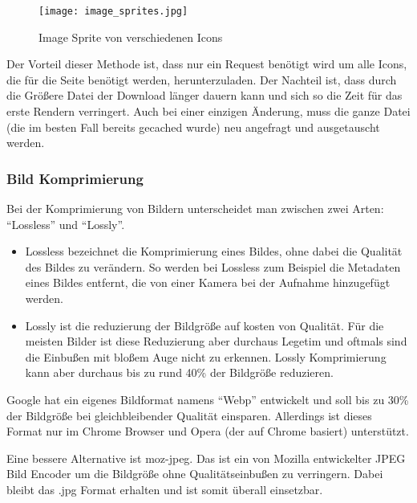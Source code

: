 			\begin{figure}[htbp]
				\begin{center}
					\texttt{[image: image\_sprites.jpg]}
					\caption{Image Sprite von verschiedenen Icons}
					\label{fig:image_sprites}
				\end{center}
			\end{figure}
			
			Der Vorteil dieser Methode ist, dass nur ein Request benötigt wird um alle Icons, die für die Seite benötigt werden, herunterzuladen. Der Nachteil ist, dass durch die Größere Datei der Download länger dauern kann und sich so die Zeit für das erste Rendern verringert. Auch bei einer einzigen Änderung, muss die ganze Datei (die im besten Fall bereits gecached wurde) neu angefragt und ausgetauscht werden.
			


		\subsubsection{Bild Komprimierung} %
		\label{ssub:bild_komprimierung}
			Bei der Komprimierung von Bildern unterscheidet man zwischen zwei Arten: "`Lossless"' und "`Lossly"'.
			\begin{itemize}
				\item Lossless bezeichnet die Komprimierung eines Bildes, ohne dabei die Qualität des Bildes zu verändern. So werden bei Lossless zum Beispiel die Metadaten eines Bildes entfernt, die von einer Kamera bei der Aufnahme hinzugefügt werden.
				\item Lossly ist die reduzierung der Bildgröße auf kosten von Qualität. Für die meisten Bilder ist diese Reduzierung aber durchaus Legetim und oftmals sind die Einbußen mit bloßem Auge nicht zu erkennen. Lossly Komprimierung kann aber durchaus bis zu rund 40\% der Bildgröße reduzieren.
			\end{itemize}

			Google hat ein eigenes Bildformat namens "`Webp"' entwickelt und soll bis zu 30\% der Bildgröße bei gleichbleibender Qualität einsparen. Allerdings ist dieses Format nur im Chrome Browser und Opera (der auf Chrome basiert) unterstützt.\autocite{canIuse}

			Eine bessere Alternative ist moz-jpeg. Das ist ein von Mozilla entwickelter JPEG Bild Encoder um die Bildgröße ohne Qualitätseinbußen zu verringern. Dabei bleibt das .jpg Format erhalten und ist somit überall einsetzbar.

